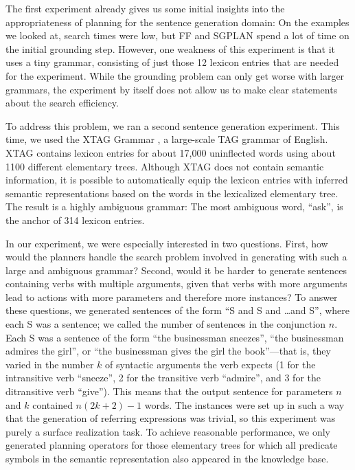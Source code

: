 The first experiment already gives us some initial insights into the
appropriateness of planning for the sentence generation domain: On the
examples we looked at, search times were low, but FF and SGPLAN spend
a lot of time on the initial grounding step.  However, one weakness of
this experiment is that it uses a tiny grammar, consisting of just
those 12 lexicon entries that are needed for the experiment. While the
grounding problem can only get worse with larger grammars, the
experiment by itself does not allow us to make clear statements about
the search efficiency.

To address this problem, we ran a second sentence generation
experiment. This time, we used the XTAG Grammar \citep{xtag01:_tr}, a
large-scale TAG grammar of English. XTAG contains lexicon entries for
about 17,000 uninflected words using about 1100 different elementary
trees. Although XTAG does not contain semantic information, it is
possible to automatically equip the lexicon entries with inferred
semantic representations based on the words in the lexicalized
elementary tree. The result is a highly ambiguous grammar: The most
ambiguous word, ``ask'', is the anchor of 314 lexicon entries.

In our experiment, we were especially interested in two
questions. First, how would the planners handle the search problem
involved in generating with such a large and ambiguous grammar?
Second, would it be harder to generate sentences containing verbs with
multiple arguments, given that verbs with more arguments lead to
actions with more parameters and therefore more instances? To answer
these questions, we generated sentences of the form ``S and S and
\ldots and S'', where each S was a sentence; we called the number of
sentences in the conjunction $n$. Each S was a sentence of the form
``the businessman sneezes'', ``the businessman admires the girl'', or
``the businessman gives the girl the book''---that is, they varied in
the number $k$ of syntactic arguments the verb expects (1 for the
intransitive verb ``sneeze'', 2 for the transitive verb ``admire'',
and 3 for the ditransitive verb ``give''). This means that the output
sentence for parameters $n$ and $k$ contained $n(2k+2)-1$ words. The
instances were set up in such a way that the generation of referring
expressions was trivial, so this experiment was purely a surface
realization task. To achieve reasonable performance, we only generated
planning operators for those elementary trees for which all predicate
symbols in the semantic representation also appeared in the knowledge
base.

